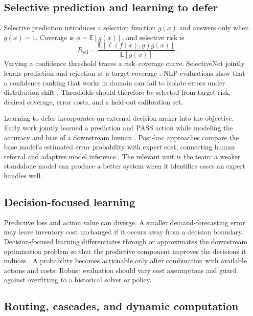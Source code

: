 \documentclass[11pt]{article}
\begin{document}
\subsection{Selective prediction and learning to defer}

Selective prediction introduces a selection function $g(x)$ and answers only when $g(x)=1$. Coverage is $\phi=\mathbb{E}[g(x)]$, and selective risk is
\begin{equation}
R_{\mathrm{sel}}=\frac{\mathbb{E}[\ell(f(x),y)g(x)]}{\mathbb{E}[g(x)]}.
\end{equation}
Varying a confidence threshold traces a risk--coverage curve. SelectiveNet jointly learns prediction and rejection at a target coverage \cite{geifman2019selectivenet}. NLP evaluations show that a confidence ranking that works in domain can fail to isolate errors under distribution shift \cite{gu2023selective,varshney2022selective}. Thresholds should therefore be selected from target risk, desired coverage, error costs, and a held-out calibration set.

Learning to defer incorporates an external decision maker into the objective. Early work jointly learned a prediction and PASS action while modeling the accuracy and bias of a downstream human \cite{madras2018defer}. Post-hoc approaches compare the base model's estimated error probability with expert cost, connecting human referral and adaptive model inference \cite{narasimhan2022defer}. The relevant unit is the team: a weaker standalone model can produce a better system when it identifies cases an expert handles well.

\subsection{Decision-focused learning}

Predictive loss and action value can diverge. A smaller demand-forecasting error may leave inventory cost unchanged if it occurs away from a decision boundary. Decision-focused learning differentiates through or approximates the downstream optimization problem so that the predictive component improves the decisions it induces \cite{wilder2019decision,mandi2023dfl}. A probability becomes actionable only after combination with available actions and costs. Robust evaluation should vary cost assumptions and guard against overfitting to a historical solver or policy.

\subsection{Routing, cascades, and dynamic computation}
\end{document}
